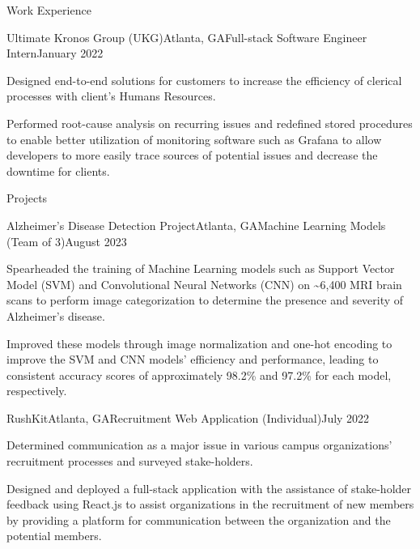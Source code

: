 \documentclass{resume} %
\begin{document}
\begin{workSection}{Work Experience}
     \begin{experience}{Ultimate Kronos Group (UKG)}{Atlanta, GA}{Full-stack Software Engineer Intern}{January 2022}
        \item Designed end-to-end solutions for customers to increase the efficiency of clerical processes with client's Humans Resources.
        \item Performed root-cause analysis on recurring issues and redefined stored procedures to enable better utilization of monitoring software such as Grafana to allow developers to more easily trace sources of potential issues and decrease the downtime for clients.
    \end{experience}
     
\end{workSection}



\begin{workSection}{Projects}
    \begin{experience}{Alzheimer's Disease Detection Project}{Atlanta, GA}{Machine Learning Models (Team of 3)}{August 2023}
        \item Spearheaded the training of Machine Learning models such as Support Vector Model (SVM) and Convolutional Neural Networks (CNN) on \textasciitilde{6,400} MRI brain scans to perform image categorization to determine the presence and severity of Alzheimer's disease.
        \item Improved these models through image normalization and one-hot encoding to improve the SVM and CNN models' efficiency and performance, leading to consistent accuracy scores of approximately 98.2\% and 97.2\% for each model, respectively.
    \end{experience}

    \begin{experience}{RushKit}{Atlanta, GA}{Recruitment Web Application (Individual)}{July 2022}
        \item Determined communication as a major issue in various campus organizations' recruitment processes and surveyed stake-holders.
        \item Designed and deployed a full-stack application with the assistance of stake-holder feedback using React.js to assist organizations in the recruitment of new members by providing a platform for communication between the organization and the potential members.
    \end{experience}

\end{workSection}
\end{document}

